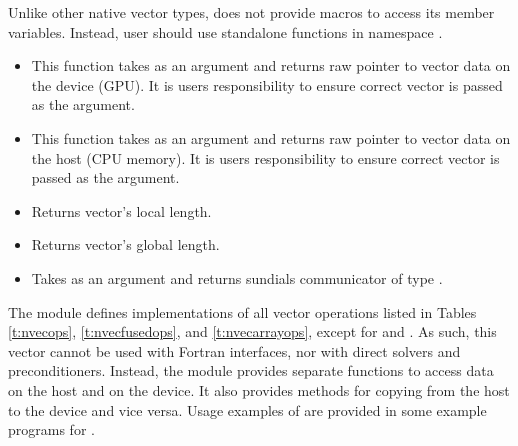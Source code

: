 Unlike other native {\sundials} vector types, {\nveccuda} does not provide macros 
to access its member variables. Instead, user should use standalone functions in
namespace . 
\begin{itemize}

\item 

  This function takes  as an argument and returns raw pointer to vector
  data on the device (GPU). It is users responsibility to ensure correct vector is
  passed as the argument.
  
\item 

  This function takes  as an argument and returns raw pointer to vector
  data on the host (CPU memory). It is users responsibility to ensure correct vector is
  passed as the argument.
  
\item {}

  Returns vector's local length.


\item {}

  Returns vector's global length.


\item {}

  Takes  as an argument and returns sundials communicator of type
  . 

\end{itemize}


The {\nveccuda} module defines implementations of all vector operations listed 
in Tables \ref{t:nvecops}, \ref{t:nvecfusedops}, and \ref{t:nvecarrayops}, except
for  and .
As such, this vector cannot be used with {\sundials} Fortran interfaces,
nor with {\sundials} direct solvers and preconditioners. Instead,
the {\nveccuda} module provides separate functions to access data on the host
and on the device. It also provides methods for copying from the host to 
the device and vice versa. Usage examples of {\nveccuda} are provided in
some example programs for {\cvode} \cite{cvode_ex}.

